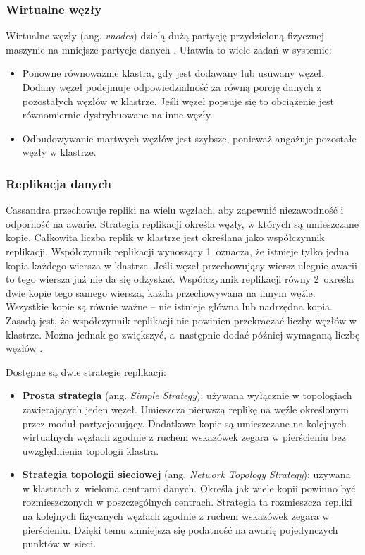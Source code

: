 \subsubsection{Wirtualne węzły}

Wirtualne węzły (ang. \textit{vnodes}) dzielą dużą partycję przydzieloną fizycznej maszynie na mniejsze partycje danych  \cite{virtualNodes}.
Ułatwia to wiele zadań w systemie:
\begin{itemize}
    \item Ponowne równoważnie klastra, gdy jest dodawany lub usuwany węzeł.
    Dodany węzeł podejmuje odpowiedzialność za równą porcję danych z pozostałych węzłów w klastrze.
    Jeśli węzeł popsuje się to obciążenie jest równomiernie dystrybuowane na inne węzły.
    \item Odbudowywanie martwych węzłów jest szybsze, ponieważ angażuje pozostałe węzły w klastrze.
\end{itemize}

\subsubsection{Replikacja danych}

Cassandra przechowuje repliki na wielu węzłach, aby zapewnić niezawodność i odporność na awarie.
Strategia replikacji określa węzły, w których są umieszczane kopie.
Całkowita liczba replik w klastrze jest określana jako współczynnik replikacji.
Współczynnik replikacji wynoszący 1~oznacza, że istnieje tylko jedna kopia każdego wiersza w klastrze.
Jeśli węzeł przechowujący wiersz ulegnie awarii to tego wiersza już nie da się odzyskać.
Współczynnik replikacji równy 2~określa dwie kopie tego samego wiersza, każda przechowywana na innym węźle.
Wszystkie kopie są równie ważne -- nie istnieje główna lub nadrzędna kopia.
Zasadą jest, że współczynnik replikacji nie powinien przekraczać liczby węzłów w klastrze.
Można jednak go zwiększyć, a~następnie dodać później wymaganą liczbę węzłów \cite{cassandraDataReplication}.

Dostępne są dwie strategie replikacji:
\begin{itemize}
    \item \textbf{Prosta strategia} (ang. \textit{Simple Strategy}): używana wyłącznie w topologiach zawierających jeden węzeł.
    Umieszcza pierwszą replikę na węźle określonym przez moduł partycjonujący.
    Dodatkowe kopie są umieszczane na kolejnych wirtualnych węzłach zgodnie z ruchem wskazówek zegara w pierścieniu bez uwzględnienia topologii klastra.
    \item \textbf{Strategia topologii sieciowej} (ang. \textit{Network Topology Strategy}): używana w klastrach z~wieloma centrami danych.
    Określa jak wiele kopii powinno być rozmieszczonych w poszczególnych centrach.
    Strategia ta rozmieszcza repliki na kolejnych fizycznych węzłach zgodnie z ruchem wskazówek zegara w pierścieniu.
    Dzięki temu zmniejsza się podatność na awarię pojedynczych punktów w~sieci.
\end{itemize}

